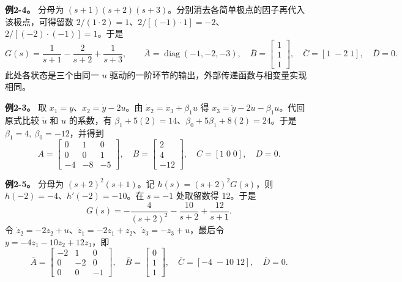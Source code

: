 \textbf{例2-4。} 分母为 $(s+1)(s+2)(s+3)$。分别消去各简单极点的因子再代入该极点，可得留数 $2/(1\cdot2)=1$、$2/[(-1)\cdot1]=-2$、$2/[(-2)\cdot(-1)]=1$。于是
\[
G(s)=\frac{1}{s+1}-\frac{2}{s+2}+\frac{1}{s+3},
\qquad
\bar A=\operatorname{diag}(-1,-2,-3),\quad
\bar B=\begin{bmatrix}1\\1\\1\end{bmatrix},\quad
\bar C=[1\;-2\;1],\quad \bar D=0.
\]
此处各状态是三个由同一 $u$ 驱动的一阶环节的输出，外部传递函数与相变量实现相同。



\sol \textbf{例2-3。} 取 $x_1=y$、$x_2=\dot y-2u$。由 $\dot x_2=x_3+\beta_1 u$ 得 $x_3=\ddot y-2\dot u-\beta_1u$。代回原式比较 $\dot u$ 和 $u$ 的系数，有 $\beta_1+5(2)=14$、$\beta_0+5\beta_1+8(2)=24$。于是 $\beta_1=4,\ \beta_0=-12$，并得到
\[
A=\begin{bmatrix}0&1&0\\0&0&1\\-4&-8&-5\end{bmatrix},\quad
B=\begin{bmatrix}2\\4\\-12\end{bmatrix},\quad C=[1\;0\;0],\quad D=0.
\]

\textbf{例2-5。} 分母为 $(s+2)^2(s+1)$。记 $h(s)=(s+2)^2G(s)$，则 $h(-2)=-4$、$h'(-2)=-10$。在 $s=-1$ 处取留数得 12。于是
\[
G(s)=-\frac{4}{(s+2)^2}-\frac{10}{s+2}+\frac{12}{s+1}.
\]
令 $\dot z_2=-2z_2+u$、$\dot z_1=-2z_1+z_2$、$\dot z_3=-z_3+u$，最后令 $y=-4z_1-10z_2+12z_3$，即
\[
\bar A=\begin{bmatrix}-2&1&0\\0&-2&0\\0&0&-1\end{bmatrix},\quad
\bar B=\begin{bmatrix}0\\1\\1\end{bmatrix},\quad
\bar C=[-4\;-10\;12],\quad \bar D=0.
\]


